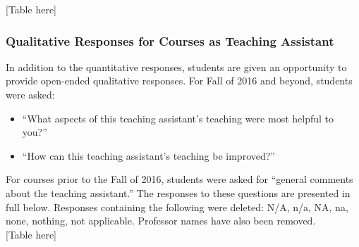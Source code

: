 \documentclass[11pt,letterpaper]{article}
\begin{document}
{{{{			[Table here]

			\subsubsection*{Qualitative Responses for Courses as Teaching Assistant}
			In addition to the quantitative responses, students are given an opportunity to provide open-ended qualitative responses. For Fall of 2016 and beyond, students were asked:
			\begin{itemize}
					\item ``What aspects of this teaching assistant's teaching were most helpful to you?''
					\item ``How can this teaching assistant's teaching be improved?''
			\end{itemize}
			For courses prior to the Fall of 2016, students were asked for ``general comments about the teaching assistant.'' The responses to these questions are presented in full below. Responses containing the following were deleted: N/A, n/a, NA, na, none, nothing, not applicable. Professor names have also been removed.\\

			[Table here]


			}{
			}
			\clearpage
		}{}
	}
}
\end{document}
